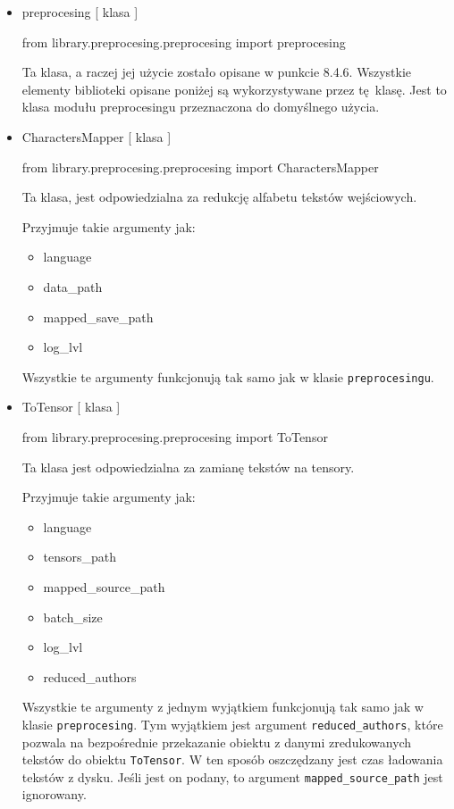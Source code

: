 \begin{itemize}
	
\item  {preprocesing [ klasa ] }
\begin{import}
from library.preprocesing.preprocesing import preprocesing
\end{import}

Ta klasa, a raczej jej użycie zostało opisane w punkcie 8.4.6. Wszystkie elementy biblioteki opisane
poniżej są wykorzystywane przez tę klasę. Jest to klasa modułu preprocesingu przeznaczona
do domyślnego użycia.

\item  {CharactersMapper [ klasa ] }
\begin{import}
from library.preprocesing.preprocesing import CharactersMapper
\end{import}
Ta klasa, jest odpowiedzialna za redukcję alfabetu tekstów wejściowych. 

Przyjmuje takie argumenty jak: 

\begin{itemize}
	\item language
	\item data\_path
	\item mapped\_save\_path
	\item log\_lvl
\end{itemize}

Wszystkie te argumenty funkcjonują tak samo jak w klasie \texttt{preprocesingu}.


\item  {ToTensor [ klasa ] }
\begin{import}
from library.preprocesing.preprocesing import ToTensor
\end{import}
Ta klasa jest odpowiedzialna za zamianę tekstów na tensory.

Przyjmuje takie argumenty jak: 

\begin{itemize}
	\item language
	\item tensors\_path
	\item mapped\_source\_path
	\item batch\_size
	\item log\_lvl
	\item reduced\_authors
\end{itemize}

Wszystkie te argumenty z jednym wyjątkiem funkcjonują tak samo jak w klasie  \texttt{preprocesing}. 
Tym wyjątkiem jest argument \texttt{reduced\_authors}, które pozwala na bezpośrednie przekazanie obiektu z danymi 
zredukowanych tekstów do obiektu  \texttt{ToTensor}. W ten sposób oszczędzany jest czas ładowania tekstów z 
dysku. Jeśli jest on podany, to argument \texttt{mapped\_source\_path} jest ignorowany.

\end{itemize}

